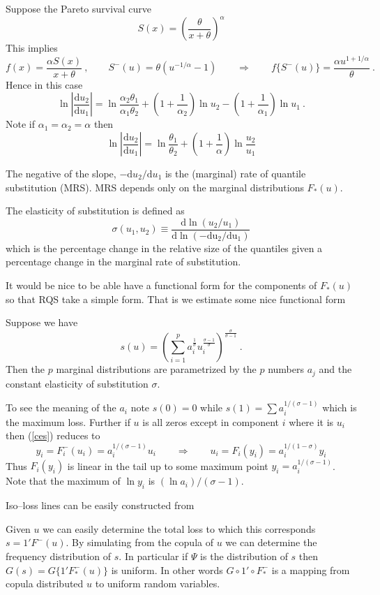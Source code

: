 \documentclass[a4paper,12pt]{article}
\newcommand{\de}{\mathrm{d}}
\begin{document}
Suppose the Pareto survival curve
$$
S(x) = \left(\frac{\theta}{x+\theta}\right)^{\alpha}
$$
This implies
$$
f(x)=\frac{\alpha S(x)}{x+\theta}\ , \qquad S^-(u)= \theta (u^{-1/\alpha}-1)\qquad\Rightarrow\qquad f\{S^-(u)\}=\frac{\alpha u^{1+1/\alpha}}{\theta}\ .
$$
Hence in this case
$$
\ln \left|\frac{\de u_2}{\de u_1}\right|= \ln \frac{\alpha_2\theta_1}{\alpha_1\theta_2} +\left(1+\frac{1}{\alpha_2}\right)\ln u_2-\left(1+\frac{1}{\alpha_1}\right)\ln u_1\ .
$$
Note if $\alpha_1=\alpha_2=\alpha$ then
$$
\ln \left|\frac{\de u_2}{\de u_1}\right|= \ln\frac{\theta_1}{\theta_2} + \left(1+\frac{1}{\alpha}\right)\ln \frac{u_2}{u_1}
$$



 The negative of the slope, $-\de u_2/\de u_1$ is the (marginal) rate of quantile substitution (MRS).  MRS depends only on the marginal distributions $F_*(u)$.
\newcommand{\s}{\sigma}

The elasticity of substitution is defined as
$$
\s (u_1,u_2)\equiv \frac{\de\ln(u_2/u_1)}{\de \ln (\mathrm{-\de u_2/\de u_1})}
$$
which is the percentage change in the relative size of the quantiles given a percentage change in the marginal rate of  substitution.


   It would be nice to be able have a functional form for the components of $F_*(u)$ so that RQS take a simple form.  That is we estimate some nice functional form



Suppose we have
\begin{equation}\label{ces}
    s(u) =\left( \sum_{i=1}^p a_i^{\frac{1}{\s}}u_i^{\frac{\s-1}{\s}}\right)^{\frac{\s}{\s-1}}\ .
\end{equation}
Then the $p$ marginal distributions are parametrized by the $p$ numbers $a_j$ and the constant elasticity of substitution $\s$.

To see the meaning of the $a_i$ note $s(0)=0$ while   $s(1)=\sum a_i^{1/(\s-1)}$ which is the maximum loss.  Further if $u$ is  all zeros except in component $i$ where it is $u_i$ then (\ref{ces}) reduces to
$$
y_i=F_i^-(u_i)=a_i^{1/(\s-1)}u_i\qquad\Rightarrow\qquad u_i=F_i(y_i)=a_i^{1/(1-\s)}y_i
$$
Thus $F_i(y_i)$ is linear in the tail up to some maximum point $y_i=a_i^{1/(\s-1)}$.  Note that the maximum of $\ln y_i$ is $(\ln a_i)/(\s -1)$.


Iso--loss lines can be easily constructed from

Given $u$ we can easily determine the total loss to which this corresponds $s=1'F^-(u)$.  By simulating from the copula of $u$ we can determine the frequency distribution of $s$.  In particular if $\Psi$ is the distribution of $s$ then $G(s)=G\{1'F_*^-(u)\}$ is uniform.  In other words
$G\circ 1'\circ F_*^-$ is a mapping from copula distributed $u$ to uniform random variables.
\end{document}
